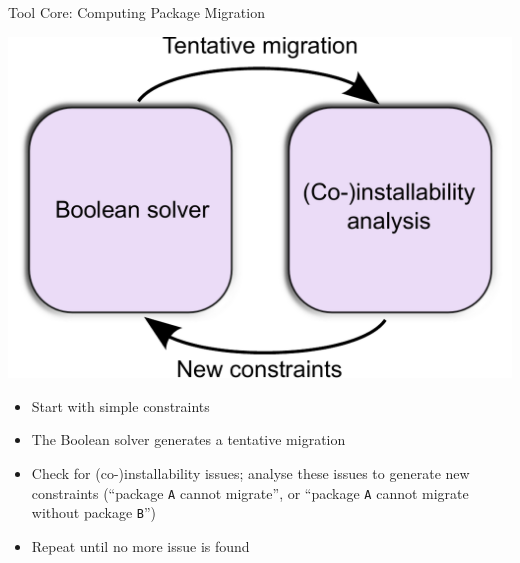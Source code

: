 \documentclass[xcolor={dvipsnames}]{beamer}
\begin{document}
\begin{frame}{Tool Core: Computing Package Migration}

\vspace{-1em}
\begin{center}
\includegraphics[width=0.5\linewidth]{architecture}
\end{center}

\vspace{-1em}

\begin{itemize}
\item Start with simple constraints
\item The Boolean solver generates a tentative migration
\item 
 Check for (co-)installability issues;
  analyse these issues to generate new constraints
  (``package \texttt{A} cannot migrate'',
  or ``package \texttt{A} cannot migrate without package \texttt{B}'')
\item Repeat until no more issue is found
\end{itemize}
\end{frame}
\end{document}
